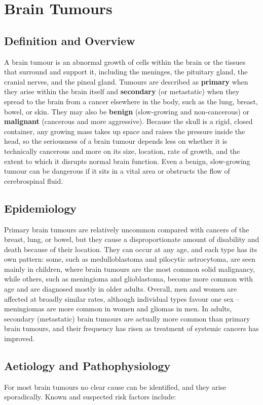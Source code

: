 \chapter{Brain Tumours}

\section*{Definition and Overview}
A brain tumour is an abnormal growth of cells within the brain or the tissues that surround and support it, including the meninges, the pituitary gland, the cranial nerves, and the pineal gland. Tumours are described as \textbf{primary} when they arise within the brain itself and \textbf{secondary} (or metastatic) when they spread to the brain from a cancer elsewhere in the body, such as the lung, breast, bowel, or skin. They may also be \textbf{benign} (slow-growing and non-cancerous) or \textbf{malignant} (cancerous and more aggressive). Because the skull is a rigid, closed container, any growing mass takes up space and raises the pressure inside the head, so the seriousness of a brain tumour depends less on whether it is technically cancerous and more on its size, location, rate of growth, and the extent to which it disrupts normal brain function. Even a benign, slow-growing tumour can be dangerous if it sits in a vital area or obstructs the flow of cerebrospinal fluid.

\section*{Epidemiology}
Primary brain tumours are relatively uncommon compared with cancers of the breast, lung, or bowel, but they cause a disproportionate amount of disability and death because of their location. They can occur at any age, and each type has its own pattern: some, such as medulloblastoma and pilocytic astrocytoma, are seen mainly in children, where brain tumours are the most common solid malignancy, while others, such as meningioma and glioblastoma, become more common with age and are diagnosed mostly in older adults. Overall, men and women are affected at broadly similar rates, although individual types favour one sex -- meningiomas are more common in women and gliomas in men. In adults, secondary (metastatic) brain tumours are actually more common than primary brain tumours, and their frequency has risen as treatment of systemic cancers has improved.

\section*{Aetiology and Pathophysiology}
For most brain tumours no clear cause can be identified, and they arise sporadically. Known and suspected risk factors include:

